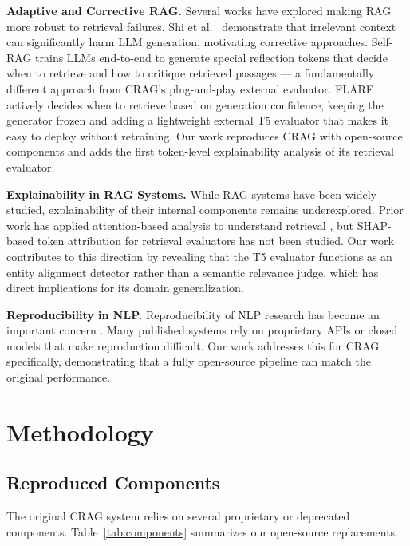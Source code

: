 \documentclass[11pt]{article}
\begin{document}
\textbf{Adaptive and Corrective RAG.} Several works have explored making RAG more robust to
retrieval failures. Shi et al.\ \cite{shi2023large} demonstrate that irrelevant context can
significantly harm LLM generation, motivating corrective approaches. Self-RAG
\cite{asai2024selfrag} trains LLMs end-to-end to generate special reflection tokens that decide
when to retrieve and how to critique retrieved passages --- a fundamentally different approach from
CRAG's plug-and-play external evaluator. FLARE \cite{jiang2023flare} actively decides when to
retrieve based on generation confidence, keeping the generator frozen and adding a lightweight
external T5 evaluator that makes it easy to deploy without retraining. Our work reproduces CRAG
with open-source components and adds the first token-level explainability analysis of its retrieval
evaluator.

\textbf{Explainability in RAG Systems.} While RAG systems have been widely studied, explainability
of their internal components remains underexplored. Prior work has applied attention-based analysis
to understand retrieval \cite{lewis2020retrieval}, but SHAP-based token attribution for retrieval
evaluators has not been studied. Our work contributes to this direction by revealing that the T5
evaluator functions as an entity alignment detector rather than a semantic relevance judge, which
has direct implications for its domain generalization.

\textbf{Reproducibility in NLP.} Reproducibility of NLP research has become an important concern
\cite{zhang2023siren}. Many published systems rely on proprietary APIs or closed models that make
reproduction difficult. Our work addresses this for CRAG specifically, demonstrating that a fully
open-source pipeline can match the original performance.

\pagebreak[3]
\section{Methodology}

\subsection{Reproduced Components}

The original CRAG system relies on several proprietary or deprecated components.
Table~\ref{tab:components} summarizes our open-source replacements.
\end{document}
